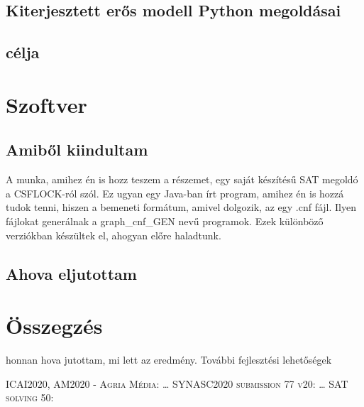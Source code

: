 \documentclass[
]{thesis-ekf}
\newtheorem{tetel}{Tétel}[chapter]
\theoremstyle{definition}
\theoremstyle{remark}
\begin{document}
	\section{Kiterjesztett erős modell Python megoldásai}
	
	
	\section{célja}
	
	
	\chapter{Szoftver}
	\section{Amiből kiindultam}
	A munka, amihez én is hozz teszem a részemet, egy saját készítésű SAT megoldó a CSFLOCK-ról szól. Ez ugyan egy Java-ban írt program, amihez én is hozzá tudok tenni, hiszen a bemeneti formátum, amivel dolgozik, az egy .cnf fájl. Ilyen fájlokat generálnak a graph\_cnf\_GEN nevű programok. Ezek különböző verziókban készültek el, ahogyan előre haladtunk.
	
	\section{Ahova eljutottam}
	
%	

	
	\chapter*{Összegzés}
	honnan hova jutottam, mi lett az eredmény. További fejlesztési lehetőségek
	
	\begin{thebibliography}{2}
		\textsc{ICAI2020, AM2020 - Agria Média}: \dots
		\textsc{SYNASC2020 submission 77 v20}: \dots
		\textsc{SAT solving 50}:
	\end{thebibliography}
	
	
\end{document}
